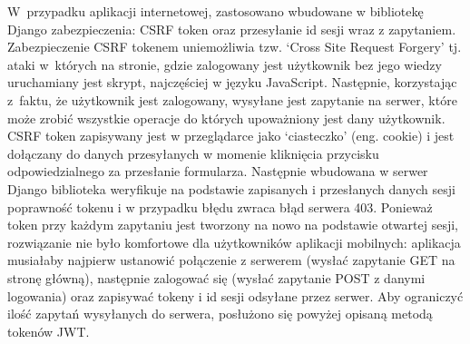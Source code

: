 W~przypadku aplikacji internetowej, zastosowano wbudowane w bibliotekę Django zabezpieczenia: CSRF token oraz przesyłanie id sesji wraz z zapytaniem. Zabezpieczenie CSRF tokenem uniemożliwia tzw. `Cross Site Request Forgery' tj. ataki w~których na stronie, gdzie zalogowany jest użytkownik bez jego wiedzy uruchamiany jest skrypt, najczęściej w języku JavaScript. Następnie, korzystając z~faktu, że użytkownik jest zalogowany, wysyłane jest zapytanie na serwer, które może zrobić wszystkie operacje do których upoważniony jest dany użytkownik. CSRF token zapisywany jest w przeglądarce jako `ciasteczko' (eng. cookie) i jest dołączany do danych przesyłanych w momenie kliknięcia przycisku odpowiedzialnego za przesłanie formularza. Następnie wbudowana w serwer Django biblioteka weryfikuje na podstawie zapisanych i przesłanych danych sesji poprawność tokenu i w przypadku błędu zwraca błąd serwera 403.
Ponieważ token przy każdym zapytaniu jest tworzony na nowo na podstawie otwartej sesji, rozwiązanie nie było komfortowe dla użytkowników aplikacji mobilnych: aplikacja musiałaby najpierw ustanowić połączenie z serwerem (wysłać zapytanie GET na stronę główną), następnie zalogować się (wysłać zapytanie POST z danymi logowania) oraz zapisywać tokeny i id sesji odsyłane przez serwer. Aby ograniczyć ilość zapytań wysyłanych do serwera, posłużono się powyżej opisaną metodą tokenów JWT.
